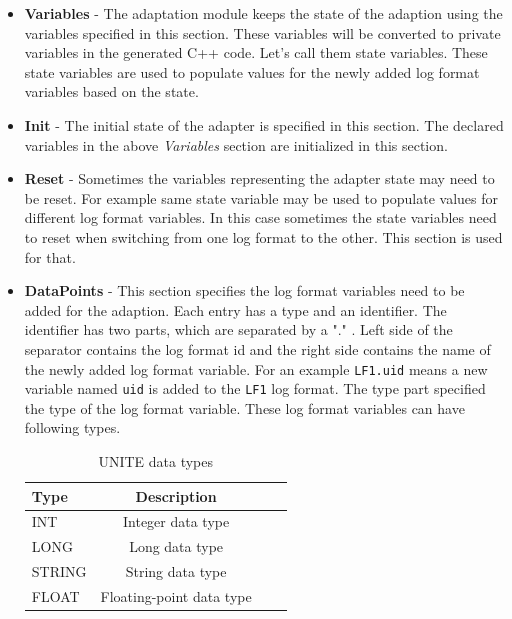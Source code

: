 \begin{itemize}
  \item \textbf{Variables} - The adaptation module keeps the state
  of the adaption using the variables specified in this section. These 
  variables will be converted to private variables in the generated 
  C++ code. Let's call them state variables. 
  These state variables are used to populate values for 
  the newly added log format variables based on the state.

\item \textbf{Init} - The initial state of the adapter is specified in this 
  section. The declared variables in the above \textit{Variables} section 
  are initialized in this section.

\item \textbf{Reset} - Sometimes the variables representing the adapter state 
  may need to be reset. For example same state variable may be used 
  to populate values for different log format variables. In this case sometimes 
  the state variables need to reset when switching from one log format 
  to the other. This section is used for that.

\item \textbf{DataPoints} - This section specifies the log format variables 
  need to be added for the adaption. Each entry has a type and an identifier.
  The identifier has two parts, which are separated by a "." . Left side of the 
  separator contains the log format id and the right side contains the name 
  of the newly added log format variable. For an example \texttt{LF1.uid} means 
  a new variable named \texttt{uid} is added to the \texttt{LF1} log format.
  The type part specified the type of the log format variable. These log format variables 
  can have following types.

\begin{table}[h, captionpos=b]
  \centering
  \caption{UNITE data types}
  \label{table:setaf-data-types}
  \begin{tabular}{lccl}
  \hline
  \textbf{Type} & \textbf{Description} \\
  \hline
  INT & Integer data type \\
  LONG & Long data type \\
  STRING & String data type \\
  FLOAT & Floating-point data type \\
  \hline
  \end{tabular}
 \end{table}


\end{itemize}
